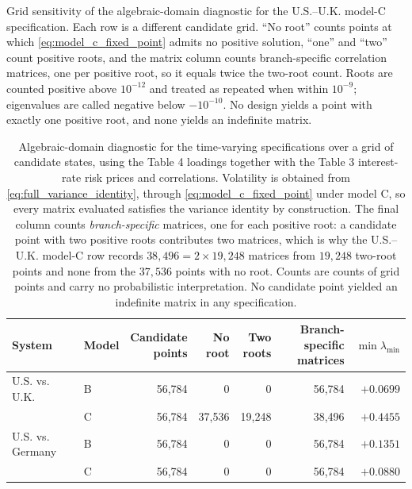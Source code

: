 \documentclass[11pt]{article}
\theoremstyle{definition}
\begin{document}
\begin{table}[htbp]
\centering
\caption{Grid sensitivity of the algebraic-domain diagnostic for the U.S.--U.K. model-C specification. Each row is a different candidate grid. ``No root'' counts points at which \eqref{eq:model_c_fixed_point} admits no positive solution, ``one'' and ``two'' count positive roots, and the matrix column counts branch-specific correlation matrices, one per positive root, so it equals twice the two-root count. Roots are counted positive above $10^{-12}$ and treated as repeated when within $10^{-9}$; eigenvalues are called negative below $-10^{-10}$. No design yields a point with exactly one positive root, and none yields an indefinite matrix.}
\label{tab:grid_sensitivity}
\footnotesize
\setlength{\tabcolsep}{3pt}

\end{table}

\begin{table}[htbp]
\centering
\caption{Algebraic-domain diagnostic for the time-varying specifications over a grid of candidate states, using the Table 4 loadings together with the Table 3 interest-rate risk prices and correlations. Volatility is obtained from \eqref{eq:full_variance_identity}, through \eqref{eq:model_c_fixed_point} under model C, so every matrix evaluated satisfies the variance identity by construction. The final column counts \emph{branch-specific} matrices, one for each positive root: a candidate point with two positive roots contributes two matrices, which is why the U.S.--U.K. model-C row records $38{,}496=2\times19{,}248$ matrices from $19{,}248$ two-root points and none from the $37{,}536$ points with no root. Counts are counts of grid points and carry no probabilistic interpretation. No candidate point yielded an indefinite matrix in any specification.}
\label{tab:time_varying}
\small
\setlength{\tabcolsep}{4pt}
\begin{tabular}{llrrrrr}
\toprule
System & Model & \makecell[r]{Candidate\\points} & \makecell[r]{No\\root} & \makecell[r]{Two\\roots} & \makecell[r]{Branch-specific\\matrices} & $\min\lambda_{\min}$ \\
\midrule
U.S. vs. U.K. & B & 56{,}784 & 0 & 0 & 56{,}784 & $+0.0699$ \\
 & C & 56{,}784 & 37{,}536 & 19{,}248 & 38{,}496 & $+0.4455$ \\
\midrule
U.S. vs. Germany & B & 56{,}784 & 0 & 0 & 56{,}784 & $+0.1351$ \\
 & C & 56{,}784 & 0 & 0 & 56{,}784 & $+0.0880$ \\
\bottomrule
\end{tabular}
\end{table}
\end{document}
